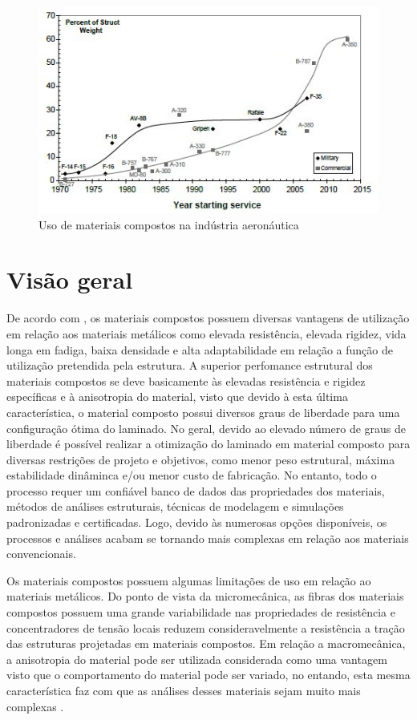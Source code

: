\begin{figure}[h]
	\caption{\label{fig_usecomposites}Uso de materiais compostos na indústria aeronáutica}
  \centering
  \includegraphics[scale=1.0]{figura/UseOfComposites}
\end{figure}

\section{Visão geral}
De acordo com \cite{daniel2006engineering}, os materiais compostos possuem diversas vantagens de utilização em relação aos materiais metálicos como elevada resistência, elevada rigidez, vida longa em fadiga, baixa densidade e alta adaptabilidade em relação a função de utilização pretendida pela estrutura. A superior perfomance estrutural dos materiais compostos se deve basicamente às elevadas resistência e rigidez específicas e à anisotropia do material, visto que devido à esta última característica, o material composto possui diversos graus de liberdade para uma configuração ótima do laminado. No geral, devido ao elevado número de graus de liberdade é possível realizar a otimização do laminado em material composto para diversas restrições de projeto e objetivos, como menor peso estrutural, máxima estabilidade dinâminca e/ou menor custo de fabricação. No entanto, todo o processo requer um confiável banco de dados das propriedades dos materiais, métodos de análises estruturais, técnicas de modelagem e simulações padronizadas e certificadas. Logo, devido às numerosas opções disponíveis, os processos e análises acabam se tornando mais complexas em relação aos materiais convencionais.

Os materiais compostos possuem algumas limitações de uso em relação ao materiais metálicos. Do ponto de vista da micromecânica, as fibras dos materiais compostos possuem uma grande variabilidade nas propriedades de resistência e concentradores de tensão locais reduzem consideravelmente a resistência a tração das estruturas projetadas em materiais compostos. Em relação a macromecânica, a anisotropia do material pode ser utilizada considerada como uma vantagem visto que o comportamento do material pode ser variado, no entando, esta mesma característica faz com que as análises desses materiais sejam muito mais complexas \cite{daniel2006engineering}.

